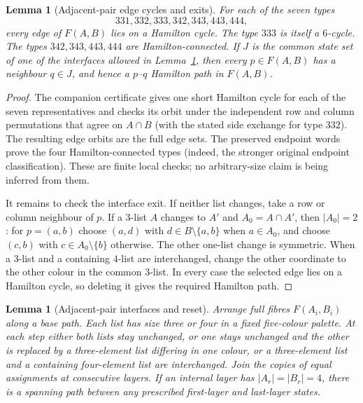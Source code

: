 \documentclass[11pt]{article}
\newtheorem{lemma}[theorem]{Lemma}
\theoremstyle{remark}
\numberwithin{equation}{section}
\numberwithin{table}{section}
\begin{document}
\begin{lemma}[Adjacent-pair edge cycles and exits]
\label{lem:pair-five-endpoints}
For each of the seven types
\[
331,332,333,342,343,443,444,
\]
every edge of $F(A,B)$ lies on a Hamilton cycle.  The type $333$ is
itself a $6$-cycle.  The types $342,343,443,444$ are
Hamilton-connected.  If $J$ is the common state set of one of the
interfaces allowed in Lemma~\ref{lem:pair-five-reset}, then every
$p\in F(A,B)$ has a neighbour $q\in J$, and hence a $p$--$q$
Hamilton path in $F(A,B)$.
\end{lemma}

\begin{proof}
The companion certificate gives one short Hamilton cycle for each of
the seven representatives and checks its orbit under the independent
row and column permutations that agree on $A\cap B$ (with the stated
side exchange for type $332$).  The resulting edge orbits are the full
edge sets.  The preserved endpoint words prove the four
Hamilton-connected types (indeed, the stronger original endpoint
classification).  These are finite local checks; no arbitrary-size
claim is being inferred from them.

It remains to check the interface exit.  If neither list changes,
take a row or column neighbour of $p$.  If a $3$-list $A$ changes to
$A'$ and $A_0=A\cap A'$, then $|A_0|=2$: for $p=(a,b)$ choose
$(a,d)$ with $d\in B\setminus\{a,b\}$ when $a\in A_0$, and choose
$(c,b)$ with $c\in A_0\setminus\{b\}$ otherwise.  The other
one-list change is symmetric.  When a $3$-list and a containing
$4$-list are interchanged, change the other coordinate to the other
colour in the common $3$-list.  In every case the selected edge lies
on a Hamilton cycle, so deleting it gives the required Hamilton path.
\end{proof}



\begin{lemma}[Adjacent-pair interfaces and reset]
\label{lem:pair-five-reset}
Arrange full fibres $F(A_i,B_i)$ along a base path.  Each list has
size three or four in a fixed five-colour palette.  At each step either
both lists stay unchanged, or one stays unchanged and the other is
replaced by a three-element list differing in one colour, or a
three-element list and a containing four-element list are interchanged.
Join the copies of equal assignments at consecutive layers.  If an
internal layer has $|A_r|=|B_r|=4$, there is a spanning path between
any prescribed first-layer and last-layer states.
\end{lemma}
\end{document}
